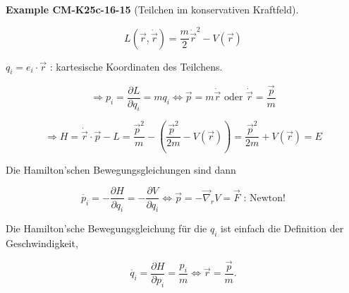 \documentclass[10pt, letterpaper]{article}
\newcommand{\CustomHeading}[3]{%
  \par\medskip\noindent%
  \textbf{#1 #2} \textnormal{(#3)}.\enskip%
}
\newenvironment{EXA}[2]{\CustomHeading{Example}{#1}{#2}}{}
\begin{document}
\begin{EXA}{CM-K25c-16-15}{Teilchen im konservativen Kraftfeld}
\[L(\vec{r}, \dot{\vec{r}}) = \frac{m}{2}\dot{\vec{r}}^2 - V(\vec{r})\]

$q_i = e_i\cdot\vec{r}$ : kartesische Koordinaten des Teilchens.

\[\Rightarrow p_i = \frac{\partial L}{\partial q_i} = mq_i \Leftrightarrow \vec{p} = m\dot{\vec{r}} \text{ oder } \dot{\vec{r}} = \frac{\vec{p}}{m}\]

\[\Rightarrow H = \dot{\vec{r}}\cdot\vec{p} - L = \frac{\vec{p}^2}{m} - \left(\frac{\vec{p}^2}{2m} - V(\vec{r})\right) = \frac{\vec{p}^2}{2m} + V(\vec{r}) = E\]

Die Hamilton'schen Bewegungsgleichungen sind dann

\[\dot{p_i} = -\frac{\partial H}{\partial q_i} = -\frac{\partial V}{\partial q_i} \Leftrightarrow \vec{p} = -\vec{\nabla}_r V = \vec{F} \text{ : Newton!}\]

Die Hamilton'sche Bewegungsgleichung für die $q_i$ ist einfach die Definition der Geschwindigkeit,

\[\dot{q_i} = \frac{\partial H}{\partial p_i} = \frac{p_i}{m} \Leftrightarrow \vec{r} = \frac{\vec{p}}{m}.\]
\end{EXA}
\end{document}
